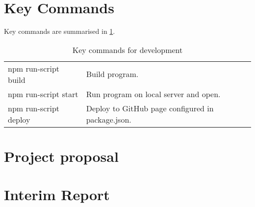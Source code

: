 \section{Key Commands}
Key commands are summarised in \cref{tab:dev_help}.
\begin{table}[!h]
  \begin{center}
    \begin{tabular}{ll}
    \hline\hline
       npm run-script build & Build program. \\
       npm run-script start & Run program on local server and open. \\
       npm run-script deploy & Deploy to GitHub page configured in package.json.\\
       \hline\hline
    \end{tabular}
  \end{center}
  \caption{Key commands for development}
  \label{tab:dev_help}
\end{table}

\section{Project proposal}


\section{Interim Report}

